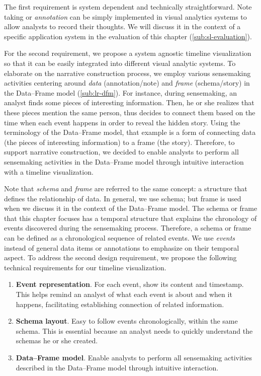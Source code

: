 The first requirement is system dependent and technically straightforward. Note taking or \emph{annotation} can be simply implemented in visual analytics systems to allow analysts to record their thoughts. We will discuss it in the context of a specific application system in the evaluation of this chapter (\autoref{sub:sl-evaluation}).

For the second requirement, we propose a system agnostic timeline visualization so that it can be easily integrated into different visual analytic systems. To elaborate on the narrative construction process, we employ various sensemaking activities centering around \emph{data} (annotation/note) and \emph{frame} (schema/story) in the Data--Frame model (\autoref{sub:lr-dfm}). For instance, during sensemaking, an analyst finds some pieces of interesting information. Then, he or she realizes that these pieces mention the same person, thus decides to connect them based on the time when each event happens in order to reveal the hidden story. Using the terminology of the Data--Frame model, that example is a form of connecting data (the pieces of interesting information) to a frame (the story). Therefore, to support narrative construction, we decided to enable analysts to perform all sensemaking activities in the Data--Frame model through intuitive interaction with a timeline visualization. 

Note that \emph{schema} and \emph{frame} are referred to the same concept: a structure that defines the relationship of data. In general, we use schema; but frame is used when we discuss it in the context of the Data--Frame model. The schema or frame that this chapter focuses has a temporal structure that explains the chronology of events discovered during the sensemaking process. Therefore, a schema or frame can be defined as a chronological sequence of related events. We use \emph{events} instead of general data items or annotations to emphasize on their temporal aspect. To address the second design requirement, we propose the following technical requirements for our timeline visualization.

\begin{enumerate}
	\item \textbf{Event representation}. For each event, show its content and timestamp. This helps remind an analyst of what each event is about and when it happens, facilitating establishing connection of related information.
	\item \textbf{Schema layout}. Easy to follow events  chronologically, within the same schema. This is essential because an analyst needs to quickly understand the schemas he or she created.
	\item \textbf{Data--Frame model}. Enable analysts to perform all sensemaking activities described in the Data--Frame model through intuitive interaction.
\end{enumerate}